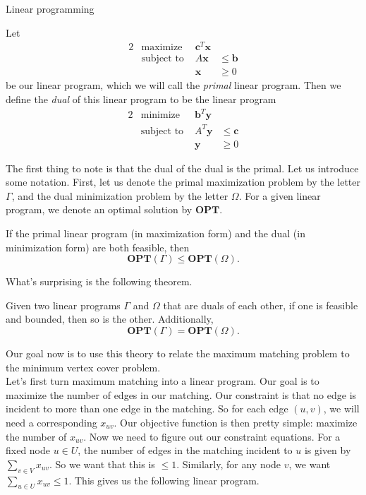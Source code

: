 \documentclass[11pt]{article}
\renewcommand{\'}{^{'}}
\newenvironment{theorem}[2][Theorem]{\begin{trivlist}
\item[\hskip \labelsep {\bfseries #1}\hskip \labelsep {\bfseries #2.}]}{\end{trivlist}}
\newenvironment{definition}[2][Definition]{\begin{trivlist}
\item[\hskip \labelsep {\bfseries #1}\hskip \labelsep {\bfseries #2.}]}{\end{trivlist}}
\begin{document}
\begin{section}{Linear programming}
	\begin{definition}{(Dual)}
		Let 
		\begin{alignat*}{2}
			& \text{maximize} & \mathbf{c}^{T}\mathbf{x} \\
			& \text{subject to } & A\mathbf{x} & \leq \mathbf{b} \\
			&& \mathbf{x} &\geq 0
		\end{alignat*}
		be our linear program, which we will call the \emph{primal} linear program. Then we 
		define the \emph{dual} of this linear program to be the linear program
		\begin{alignat*}{2}
			& \text{minimize} & \mathbf{b}^{T}\mathbf{y} \\
			& \text{subject to } & A^{T}\mathbf{y} & \leq \mathbf{c} \\
			&& \mathbf{y} &\geq 0
		\end{alignat*}
	\end{definition}
	The first thing to note is that the dual of the dual is the primal. Let us introduce some 
	notation. First, let us denote the primal maximization problem by the letter $\Gamma$, and 
	the dual minimization problem by the letter $\Omega$. For a given linear program, we denote 
	an optimal solution by $\mathbf{OPT}$. 

	\begin{theorem}{(Weak duality)}
		If the primal linear program (in maximization form) and the dual (in minimization 
		form) are both feasible, then 
		\[
			\mathbf{OPT}(\Gamma) \leq \mathbf{OPT}(\Omega).
		\]
	\end{theorem}
	What's surprising is the following theorem.

	\begin{theorem}{(Strong duality)}
		Given two linear programs $\Gamma$ and $\Omega$ that are duals of each other, if one is 
		feasible and bounded, then so is the other. Additionally, 
		\[
			\mathbf{OPT}(\Gamma) = \mathbf{OPT}(\Omega).
		\]
	\end{theorem}
	Our goal now is to use this theory to relate the maximum matching problem to the minimum 
	vertex cover problem.\\
	Let's first turn maximum matching into a linear program. Our goal is to maximize the number 
	of edges in our matching. Our constraint is that no edge is incident to more than one edge 
	in the matching. So for each edge $(u,v)$, we will need a corresponding $x_{uv}$. Our objective 
	function is then pretty simple: maximize the number of $x_{uv}$. Now we need to figure out 
	our constraint equations. For a fixed node $u\in U$, the number of edges in the matching 
	incident 
	to $u$ is given by $\sum_{v\in V} x_{uv}$. So we want that this is $\leq 1$. Similarly, for any 
	node $v$, we want $\sum_{u\in U} x_{uv} \leq 1$. This gives us the following linear program.


\end{section}
\end{document}
